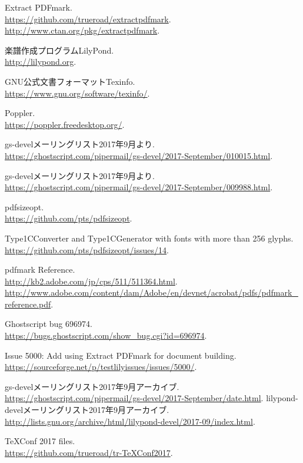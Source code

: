 \documentclass[twocolumn,jafontscale=0.962216,jlreq_notes]{jlreq}
\begin{document}
\begin{thebibliography}{99}

 Extract PDFmark. \\
  \url{https://github.com/trueroad/extractpdfmark}. \\
  \url{http://www.ctan.org/pkg/extractpdfmark}.

 楽譜作成プログラムLilyPond. \\
  \url{http://lilypond.org}.

 GNU公式文書フォーマットTexinfo. \\
  \url{https://www.gnu.org/software/texinfo/}.

 Poppler. \\
  \url{https://poppler.freedesktop.org/}.

 gs-develメーリングリスト2017年9月より. \\
  \url{https://ghostscript.com/pipermail/gs-devel/2017-September/010015.html}.

 gs-develメーリングリスト2017年9月より. \\
  \url{https://ghostscript.com/pipermail/gs-devel/2017-September/009988.html}.

 pdfsizeopt. \\
  \url{https://github.com/pts/pdfsizeopt}.

 Type1CConverter and Type1CGenerator
  with fonts with more than 256 glyphs. \\
  \url{https://github.com/pts/pdfsizeopt/issues/14}.

 pdfmark Reference. \\
  \url{http://kb2.adobe.com/jp/cps/511/511364.html}. \\
  \url{http://www.adobe.com/content/dam/Adobe/en/devnet/acrobat/pdfs/pdfmark_reference.pdf}.

 Ghostscript bug 696974. \\
  \url{https://bugs.ghostscript.com/show_bug.cgi?id=696974}.

 Issue 5000:
  Add using Extract PDFmark for document building. \\
  \url{https://sourceforge.net/p/testlilyissues/issues/5000/}.

 gs-develメーリングリスト2017年9月アーカイブ. \\
  \url{https://ghostscript.com/pipermail/gs-devel/2017-September/date.html}.
 lilypond-develメーリングリスト2017年9月アーカイブ. \\
  \url{http://lists.gnu.org/archive/html/lilypond-devel/2017-09/index.html}.

 TeXConf 2017 files. \\
  \url{https://github.com/trueroad/tr-TeXConf2017}.

\end{thebibliography}
\end{document}
